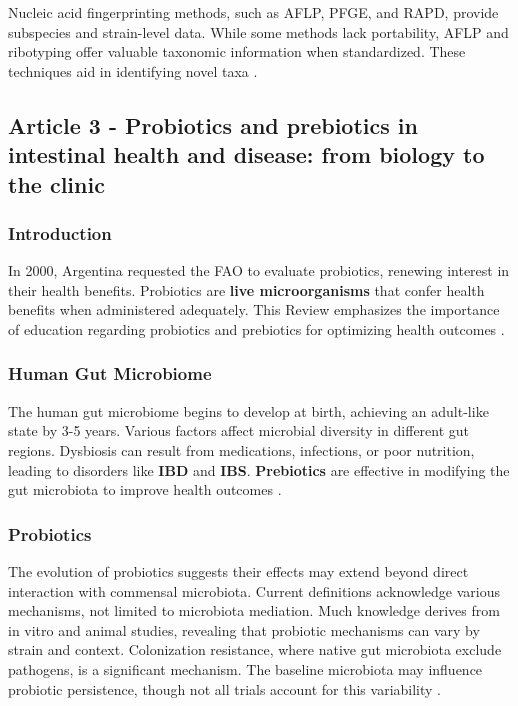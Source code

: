 Nucleic acid fingerprinting methods, such as AFLP, PFGE, and RAPD, provide subspecies and strain-level data. While some methods lack portability, AFLP and ribotyping offer valuable taxonomic information when standardized. These techniques aid in identifying novel taxa \cite*{L10-PropMin}.

\subsection{Article 3 - Probiotics and prebiotics in intestinal health and disease: from biology to the clinic}
\subsubsection*{Introduction}
In 2000, Argentina requested the FAO to evaluate probiotics, renewing interest in their health benefits. Probiotics are \textbf{live microorganisms} that confer health benefits when administered adequately. This Review emphasizes the importance of education regarding probiotics and prebiotics for optimizing health outcomes \cite*{L10-Pro_Pre}.

\subsubsection*{Human Gut Microbiome}
The human gut microbiome begins to develop at birth, achieving an adult-like state by 3-5 years. Various factors affect microbial diversity in different gut regions. Dysbiosis can result from medications, infections, or poor nutrition, leading to disorders like \textbf{IBD} and \textbf{IBS}. \textbf{Prebiotics} are effective in modifying the gut microbiota to improve health outcomes \cite*{L10-Pro_Pre}.

\subsubsection*{Probiotics}
The evolution of probiotics suggests their effects may extend beyond direct interaction with commensal microbiota. Current definitions acknowledge various mechanisms, not limited to microbiota mediation. Much knowledge derives from in vitro and animal studies, revealing that probiotic mechanisms can vary by strain and context. Colonization resistance, where native gut microbiota exclude pathogens, is a significant mechanism. The baseline microbiota may influence probiotic persistence, though not all trials account for this variability \cite*{L10-Pro_Pre}.

